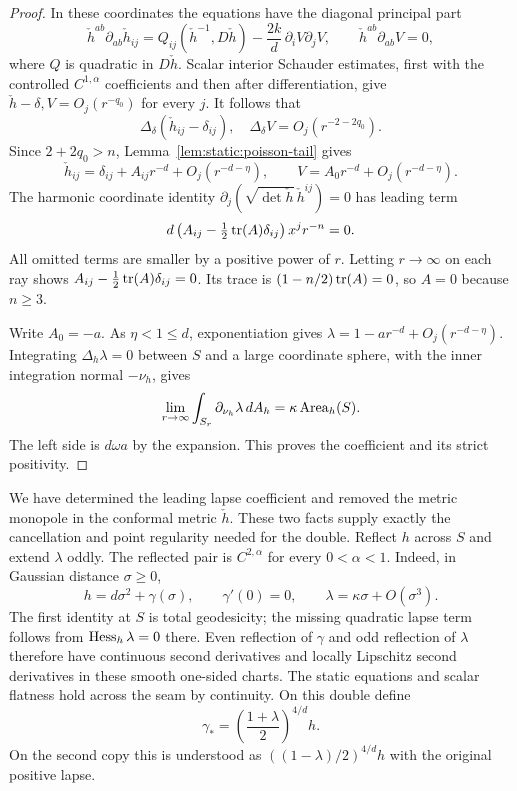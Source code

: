 \begin{proof}
In these coordinates the equations have the diagonal principal part
\[
 \check h^{ab}\partial_{ab}\check h_{ij}
   =Q_{ij}(\check h^{-1},D\check h)
      -\frac{2k}{d}\,\partial_iV\partial_jV,
 \qquad
 \check h^{ab}\partial_{ab}V=0,
\]
where $Q$ is quadratic in $D\check h$.  Scalar interior Schauder
estimates, first with the controlled $C^{1,\alpha}$ coefficients and
then after differentiation, give
$\check h-\delta,V=O_j(r^{-q_0})$ for every $j$.
It follows that
\[
 \Delta_\delta(\check h_{ij}-\delta_{ij}),\quad
 \Delta_\delta V=O_j(r^{-2-2q_0}).
\]
Since $2+2q_0>n$, Lemma~\ref{lem:static:poisson-tail} gives
\[
 \check h_{ij}=\delta_{ij}+A_{ij}r^{-d}
                  +O_j(r^{-d-\eta}),\qquad
 V=A_0r^{-d}+O_j(r^{-d-\eta}).
\]
The harmonic coordinate identity
$\partial_j(\sqrt{\det\check h}\,\check h^{ij})=0$ has leading term
\[
 d\left(A_{ij}-\tfrac12\operatorname{tr}(A)\delta_{ij}\right)x^j r^{-n}=0.
\]
All omitted terms are smaller by a positive power of $r$.  Letting
$r\to\infty$ on each ray shows
$A_{ij}-\tfrac12\operatorname{tr}(A)\delta_{ij}=0$.  Its trace is
$(1-n/2)\operatorname{tr}(A)=0$, so $A=0$ because $n\ge3$.

Write $A_0=-a$.  As $\eta<1\le d$, exponentiation gives
$\lambda=1-a r^{-d}+O_j(r^{-d-\eta})$.
Integrating $\Delta_h\lambda=0$ between $S$ and a large coordinate
sphere, with the inner integration normal $-\nu_h$, gives
\[
 \lim_{r\to\infty}\int_{S_r}\partial_{\nu_h}\lambda\,dA_h
   =\kappa\operatorname{Area}_h(S).
\]
The left side is $d\omega a$ by the expansion.  This proves the
coefficient and its strict positivity.
\end{proof}

We have determined the leading lapse coefficient and removed the
metric monopole in the conformal metric $\check h$.  These two facts
supply exactly the cancellation and point regularity needed for the
double.  Reflect $h$ across $S$ and extend $\lambda$ oddly.  The reflected
pair is $C^{2,\alpha}$ for every $0<\alpha<1$.  Indeed, in Gaussian
distance $\sigma\ge0$,
\[
 h=d\sigma^2+\gamma(\sigma),\qquad
 \gamma'(0)=0,\qquad
 \lambda=\kappa\sigma+O(\sigma^3).
\]
The first identity at $S$ is total geodesicity; the missing quadratic
lapse term follows from $\operatorname{Hess}_h\lambda=0$ there.  Even reflection of
$\gamma$ and odd reflection of $\lambda$ therefore have continuous
second derivatives and locally Lipschitz second derivatives in these
smooth one-sided charts.  The static equations and scalar flatness
hold across the seam by continuity.  On this double define
\begin{equation}
 \gamma_* =\left(\frac{1+\lambda}{2}\right)^{4/d}h.
 \label{eq:static:doubled-metric}
\end{equation}
On the second copy this is understood as
$((1-\lambda)/2)^{4/d}h$ with the original positive lapse.

